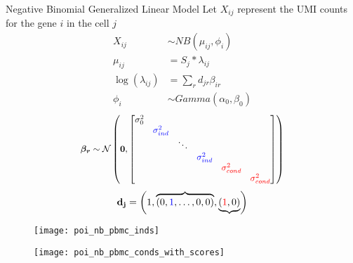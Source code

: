 \begin{frame}{Negative Binomial Generalized Linear Model}
  Let \(X_{ij}\) represent the UMI counts for the gene \(i\) in the cell \(j\)
  \begin{align}
    X_{ij} &\sim NB(\mu_{ij}, \phi_i) \\
    \mu_{ij}  &= S_j * \lambda_{ij} \\
    \log(\lambda_{ij})  &= \sum_r d_{jr} \beta_{ir} \\
    \phi_{i} &\sim Gamma(\alpha_0, \beta_0) 
  \end{align}
  \begin{equation*}
    \resizebox{0.6\hsize}{!}{$%
    \bm{\beta_r} \sim {\cal N}\left(\bm{0}, 
    \begin{bmatrix}
      \sigma_0^2  &     & & & &\\
      &   \myemph{\sigma_{ind}^2} & & & &\\
      &    &     \ddots &      & & \\
      &    &     & \myemph{\sigma_{ind}^2}  & & \\
      &    &     &  &   \mywarn{\sigma_{cond}^2} &  \\
      &    &     &   &    &  \mywarn{\sigma_{cond}^2} 
      \end{bmatrix}
    \right)
    $%
    }%
  \end{equation*}
  \begin{equation*}
    \mathbf{d_j} = \left(1, \overbrace{(0, \textcolor{blue}{1}, \dots, 0, 0)}, \underbrace{(\textcolor{red}{1}, 0)}\right)
  \end{equation*}

\end{frame}

\begin{frame}
  \begin{figure}
    \centering
    \texttt{[image: poi\_nb\_pbmc\_inds]}
  \end{figure}
\end{frame}

\begin{frame}
  \begin{figure}
    \centering
    \texttt{[image: poi\_nb\_pbmc\_conds\_with\_scores]}
  \end{figure}
\end{frame}
